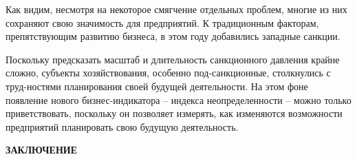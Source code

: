 \documentclass[14pt,a4paper]{article}
\begin{document}
    Как видим, несмотря на некоторое смягчение отдельных проблем, многие из них сохраняют свою значимость для предприятий.
    К традиционным факторам, препятствующим развитию бизнеса, в этом году добавились западные санкции.
    \par
    Поскольку предсказать масштаб и длительность санкционного давления крайне сложно, субъекты хозяйствования, особенно под-санкционные, столкнулись с труд-ностями планирования своей будущей деятельности.
    На этом фоне появление нового бизнес-индикатора – индекса неопределенности – можно только приветствовать, поскольку он позволяет измерять, как изменяются возможности предприятий планировать свою будущую деятельность.
    \par


    \newpage
    \begin{center}
        \textbf{\LARGE{ЗАКЛЮЧЕНИЕ}}
    \end{center}
\end{document}
